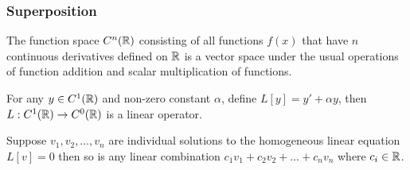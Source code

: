 \documentclass[class=article,crop=false]{standalone}
\begin{document}
\subsubsection{Superposition}
\begin{eg}
	The function space $C^n(\mathbb{R})$ consisting of all functions $f(x)$ that have  $n$ continuous derivatives defined on  $\mathbb{R}$ is a vector space under the usual operations of function addition and scalar multiplication of functions.
\end{eg}

\begin{eg}[]
	For any $y \in C^1(\mathbb{R})$ and non-zero constant $\alpha$, define $L[y]=y'+\alpha y$, then $L: C^1(\mathbb{R}) \to C^0(\mathbb{R})$ is a linear operator.
\end{eg}
\begin{thm}
	Suppose $v_1,v_2,\ldots,v_n$ are individual solutions to the homogeneous linear equation $L[v]=0$ then so is any linear combination  $c_1 v_1+c_2v_2+\ldots+c_n v_n$ where $c_i \in \mathbb{R}$.
\end{thm}
\end{document}
